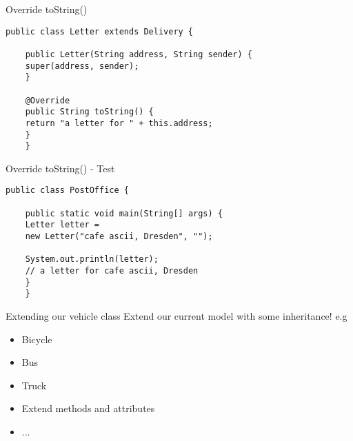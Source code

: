 \begin{frame}[fragile]{Override toString()}
	\begin{lstlisting}[escapechar=!]
	public class Letter extends Delivery {
	
	public Letter(String address, String sender) {
	super(address, sender);
	}
	
	@Override
	public String toString() {
	return "a letter for " + this.address;
	}	
	}
	\end{lstlisting}
\end{frame}

\begin{frame}[fragile]{Override toString() - Test}
	\begin{lstlisting}[escapechar=!]
	public class PostOffice {
	
	public static void main(String[] args) {	    
	Letter letter = 
	new Letter("cafe ascii, Dresden", "");
	
	System.out.println(letter);
	// a letter for cafe ascii, Dresden
	}
	}
	\end{lstlisting}
\end{frame}

\begin{frame}{Extending our vehicle class}
	Extend our current model with some inheritance! e.g
	\begin{itemize}
		\item Bicycle
		\item Bus
		\item Truck
		\item Extend methods and attributes
		\item ...
	\end{itemize}
	
\end{frame}


